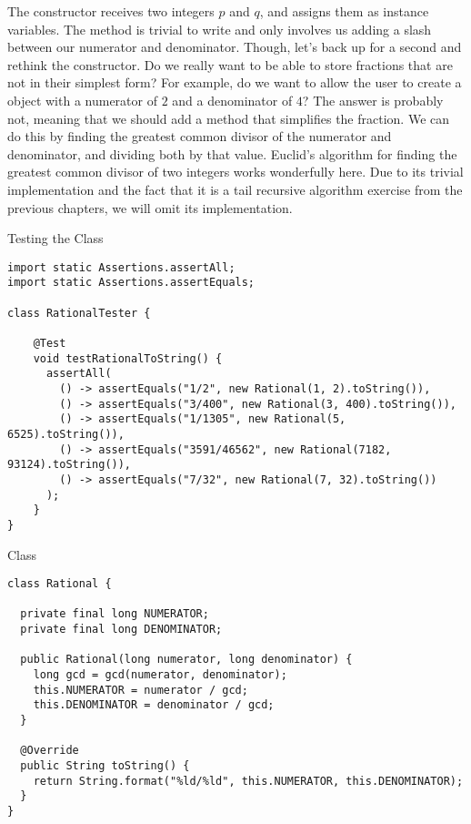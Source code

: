 The  constructor receives two integers $p$ and $q$, and assigns them as instance variables. The  method is trivial to write and only involves us adding a slash between our numerator and denominator. Though, let's back up for a second and rethink the constructor. Do we really want to be able to store fractions that are not in their simplest form? For example, do we want to allow the user to create a  object with a numerator of $2$ and a denominator of $4$? The answer is probably not, meaning that we should add a method that simplifies the fraction. We can do this by finding the greatest common divisor of the numerator and denominator, and dividing both by that value. Euclid's algorithm for finding the greatest common divisor of two integers works wonderfully here. Due to its trivial implementation and the fact that it is a tail recursive algorithm exercise from the previous chapters, we will omit its implementation.

\begin{cl}{Testing the  Class}
\begin{lstlisting}[language=MyJava]
import static Assertions.assertAll;
import static Assertions.assertEquals;

class RationalTester {
  
    @Test
    void testRationalToString() {
      assertAll(
        () -> assertEquals("1/2", new Rational(1, 2).toString()),
        () -> assertEquals("3/400", new Rational(3, 400).toString()),
        () -> assertEquals("1/1305", new Rational(5, 6525).toString()),
        () -> assertEquals("3591/46562", new Rational(7182, 93124).toString()),
        () -> assertEquals("7/32", new Rational(7, 32).toString())
      );
    }
}
\end{lstlisting}
\end{cl}

\begin{cl}{ Class}
\begin{lstlisting}[language=MyJava]
class Rational {
  
  private final long NUMERATOR;
  private final long DENOMINATOR;

  public Rational(long numerator, long denominator) {
    long gcd = gcd(numerator, denominator);
    this.NUMERATOR = numerator / gcd;
    this.DENOMINATOR = denominator / gcd; 
  }

  @Override
  public String toString() {
    return String.format("%ld/%ld", this.NUMERATOR, this.DENOMINATOR);
  }
}
\end{lstlisting}
\end{cl}

